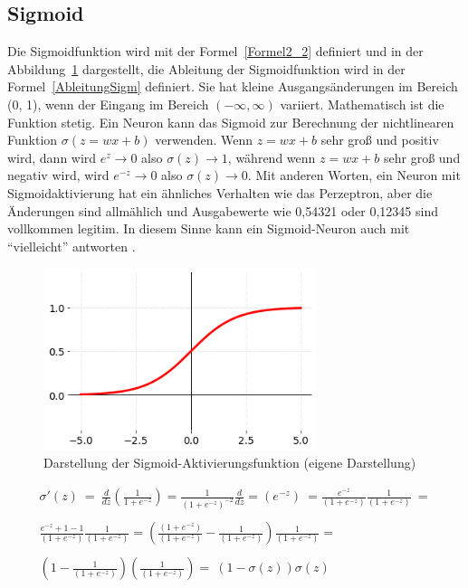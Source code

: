 \subsection{Sigmoid}
Die Sigmoidfunktion wird mit der Formel~\ref{Formel2_2} definiert und in der Abbildung~\ref{Kap2:Sigmoid_plot} dargestellt, die Ableitung der Sigmoidfunktion wird in der Formel~\ref{AbleitungSigm} definiert. Sie hat kleine Ausgangsänderungen im Bereich (0, 1), wenn der Eingang im Bereich $(-\infty, \infty)$ variiert. Mathematisch ist die Funktion stetig. Ein Neuron kann das Sigmoid zur Berechnung der nichtlinearen Funktion $\sigma(z = wx + b)$ verwenden. Wenn $z = wx + b$ sehr groß und positiv wird, dann wird $e^z \rightarrow 0$ also $\sigma(z) \rightarrow 1$, während wenn $z = wx + b$ sehr groß und negativ wird, wird $e^{-z} \rightarrow 0$ also $\sigma(z) \rightarrow 0$. Mit anderen Worten, ein Neuron mit Sigmoidaktivierung hat ein ähnliches Verhalten wie das Perzeptron, aber die Änderungen sind allmählich und Ausgabewerte wie 0,54321 oder 0,12345 sind vollkommen legitim. In diesem Sinne kann ein Sigmoid-Neuron auch mit \enquote{vielleicht} antworten \cite*[10]{AntonioGuili;AmitaKapoor;SujitPal2019}.

\begin{figure}[H]
    \centering
    \includegraphics[width=8cm]{kapitel2/sig_plot.png}
    \caption[Darstellung der Sigmoid-Aktivierungsfunktion]{Darstellung der Sigmoid-Aktivierungsfunktion (eigene Darstellung)}
    \label{Kap2:Sigmoid_plot}
\end{figure}


\begin{equation} \label{AbleitungSigm}
    \begin{array}{ c }
        \sigma '(z)\ =\ \frac{d}{dz}\left(\frac{1}{1+e^{-z}}\right) =\frac{1}{\left( 1+e^{-z}\right)^{-2}}\frac{d}{dz} =\left( e^{-z}\right) \ =\frac{e^{-z}}{\left( 1+e^{-z}\right)}\frac{1}{\left( 1+e^{-z}\right)} \ =  \\
        \\
        \frac{e^{-z} +1-1}{\left( 1+e^{-z}\right)}\frac{1}{\left( 1+e^{-z}\right)} =\left(\frac{\left( 1+e^{-z}\right)}{\left( 1+e^{-z}\right)} -\frac{1}{\left( 1+e^{-z}\right)}\right)\frac{1}{\left( 1+e^{-z}\right)} = \\
        \\
        \left( 1-\frac{1}{\left( 1+e^{-z}\right)}\right)\left(\frac{1}{\left( 1+e^{-z}\right)}\right) =\ (1-\sigma (z))\sigma (z)
    \end{array}
\end{equation}
\label{AbleitungSigm}

